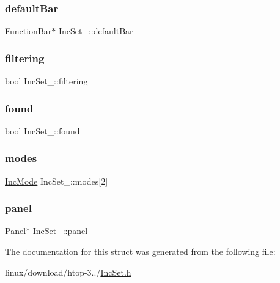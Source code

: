 \mbox{\label{structIncSet___a16a99b2fe86fb1f37d8d2ec053281a9e}} 
\subsubsection{\texorpdfstring{default\+Bar}{defaultBar}}
{\footnotesize\ttfamily \hyperlink{FunctionBar_8h_acbf21c40af2139c165bafd8061c2ceda}{Function\+Bar}$\ast$ Inc\+Set\+\_\+\+::default\+Bar}

\mbox{\label{structIncSet___a024b80e5a3b2d481b35d1cdddea3675c}} 
\subsubsection{\texorpdfstring{filtering}{filtering}}
{\footnotesize\ttfamily bool Inc\+Set\+\_\+\+::filtering}

\mbox{\label{structIncSet___a30d3df50f4de47583559cdea10f6ebd3}} 
\subsubsection{\texorpdfstring{found}{found}}
{\footnotesize\ttfamily bool Inc\+Set\+\_\+\+::found}

\mbox{\label{structIncSet___a4b7759bd0a433645a7856326d88603d9}} 
\subsubsection{\texorpdfstring{modes}{modes}}
{\footnotesize\ttfamily \hyperlink{IncSet_8h_a8b24215d6d25d0ec7df745f612e33960}{Inc\+Mode} Inc\+Set\+\_\+\+::modes\mbox{[}2\mbox{]}}

\mbox{\label{structIncSet___ae80c8103943b863882e6cbf32f6e3579}} 
\subsubsection{\texorpdfstring{panel}{panel}}
{\footnotesize\ttfamily \hyperlink{Panel_8h_a034d4c16521db412dc7a1e8536d16fae}{Panel}$\ast$ Inc\+Set\+\_\+\+::panel}



The documentation for this struct was generated from the following file\+:\begin{DoxyCompactItemize}
\item 
linux/download/htop-\/3../\hyperlink{IncSet_8h}{Inc\+Set.\+h}\end{DoxyCompactItemize}
